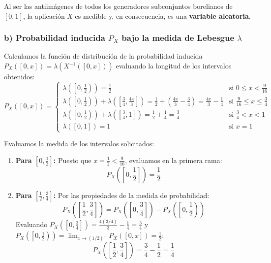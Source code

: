 \begin{problema}
Al ser las antiimágenes de todos los generadores subconjuntos borelianos de $[0, 1]$, la aplicación $X$ es medible y, en consecuencia, es una \textbf{variable aleatoria}.

\subsubsection*{b) Probabilidad inducida $P_X$ bajo la medida de Lebesgue $\lambda$}
Calculamos la función de distribución de la probabilidad inducida $P_X([0, x]) = \lambda(X^{-1}([0, x]))$ evaluando la longitud de los intervalos obtenidos:
\[
    P_X([0, x]) = \begin{cases}
        \lambda\left(\left[0, \frac{1}{2}\right)\right) = \frac{1}{2} & \text{si } 0 \le x < \frac{9}{16} \\[6pt]
        \lambda\left(\left[0, \frac{1}{2}\right)\right) + \lambda\left(\left[\frac{3}{4}, \frac{4x}{3}\right]\right) = \frac{1}{2} + \left(\frac{4x}{3} - \frac{3}{4}\right) = \frac{4x}{3} - \frac{1}{4} & \text{si } \frac{9}{16} \le x \le \frac{3}{4} \\[6pt]
        \lambda\left(\left[0, \frac{1}{2}\right)\right) + \lambda\left(\left[\frac{3}{4}, 1\right]\right) = \frac{1}{2} + \frac{1}{4} = \frac{3}{4} & \text{si } \frac{3}{4} < x < 1 \\[6pt]
        \lambda([0, 1]) = 1 & \text{si } x = 1
    \end{cases}
\]

Evaluamos la medida de los intervalos solicitados:
\begin{enumerate}[label=\arabic*.]
    \item \textbf{Para $\left[0, \frac{1}{2}\right]$:}
    Puesto que $x = \frac{1}{2} < \frac{9}{16}$, evaluamos en la primera rama:
    \[
        P_X\left(\left[0, \frac{1}{2}\right]\right) = \frac{1}{2}
    \]

    \item \textbf{Para $\left[\frac{1}{2}, \frac{3}{4}\right]$:}
    Por las propiedades de la medida de probabilidad:
    \[
        P_X\left(\left[\frac{1}{2}, \frac{3}{4}\right]\right) = P_X\left(\left[0, \frac{3}{4}\right]\right) - P_X\left(\left[0, \frac{1}{2}\right)\right)
    \]
    Evaluando $P_X\left(\left[0, \frac{3}{4}\right]\right) = \frac{4(3/4)}{3} - \frac{1}{4} = \frac{3}{4}$ y $P_X\left(\left[0, \frac{1}{2}\right)\right) = \lim_{x \to (1/2)^-} P_X([0, x]) = \frac{1}{2}$:
    \[
        P_X\left(\left[\frac{1}{2}, \frac{3}{4}\right]\right) = \frac{3}{4} - \frac{1}{2} = \frac{1}{4}
    \]
\end{enumerate}


\end{problema}

